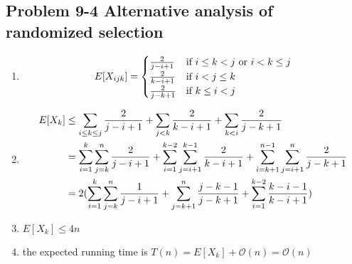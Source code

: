 \subsection*{Problem 9-4 Alternative analysis of randomized selection}
\begin{enumerate}
	\item	\begin{equation} \notag
			E[X_{ijk}] = \begin{cases}
				\frac{2}{j - i + 1} & $if $ i \leq k < j $ or $ i < k \leq j \\
				\frac{2}{k - i + 1} & $if $ i < j \leq k \\
				\frac{2}{j - k + 1} & $if $ k \leq i < j \\
			\end{cases} 
		\end{equation}
	\item	\begin{equation} \notag
		\begin{aligned}
			E[X_k] & \leq \sum_{i \leq k \leq j} \frac{2}{j - i + 1} + \sum_{j < k} \frac{2}{k - i + 1} + \sum_{k < i} \frac{2}{j - k + 1} \\
				& = \sum_{i = 1}^k \sum_{j = k}^n \frac{2}{j - i + 1} + \sum_{i = 1}^{k - 2} \sum_{j = i + 1}^{k - 1} \frac{2}{k - i + 1} + \sum_{i = k + 1}^{n - 1} \sum_{j = i + 1}^{n} \frac{2}{j - k + 1} \\
				& = 2(\sum_{i = 1}^k \sum_{j = k}^n \frac{1}{j - i + 1} + \sum_{j = k + 1}^{n} \frac{j - k - 1}{j - k + 1} + \sum_{i = 1}^{k - 2} \frac{k - i - 1}{k - i + 1})
		\end{aligned}
		\end{equation}
	\item	$E[X_k] \leq 4n$
	\item	the expected running time is $T(n) = E[X_k] + \mathcal{O}(n) = \mathcal{O}(n)$
\end{enumerate}

